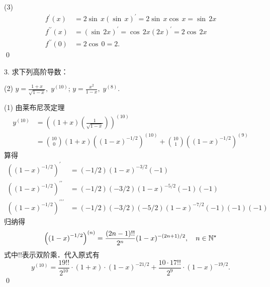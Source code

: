 (3) \solve
\begin{align}
    f^{\prime}(x) &= 2\sin \, x \left(\sin \, x\right)^\prime = 2 \sin \, x \cos \, x = \sin \, 2x \\
    f^{\prime\prime}(x) &= \left(\sin \, 2x\right)^\prime = \cos \, 2x \left(2x\right)^\prime = 2\cos \, 2x \\
    f^{\prime\prime}(0) &= 2 \cos \, 0 = 2.
\end{align}
\qed\bigskip

3. 求下列高阶导数：
\begin{tasks}(2)
    \task $y=\displaystyle\frac{1+x}{\sqrt{1-x}}, \; y^{(10)}$;
    \task $y=\displaystyle\frac{x^2}{1-x}, \; y^{(8)}$.
\end{tasks}
\bigskip

(1) \solve 由莱布尼茨定理
\begin{align}
    y^{(10)} &= \left(\left(1+x\right)\left(\frac{1}{\sqrt{1-x}}\right)\right)^{(10)} \\
    &= \binom{10}{0} \left(1+x\right)\left(\left(1-x\right)^{-1/2}\right)^{(10)} + \binom{10}{1}\left(\left(1-x\right)^{-1/2}\right)^{(9)}
\end{align}
算得
\begin{align}
    \left(\left(1-x\right)^{-1/2}\right)^\prime &=  (-1/2)\left(1-x\right)^{-3/2}(-1) \\
    \left(\left(1-x\right)^{-1/2}\right)^{\prime\prime} &=  (-1/2)(-3/2)\left(1-x\right)^{-5/2}(-1)(-1) \\
    \left(\left(1-x\right)^{-1/2}\right)^{\prime\prime\prime} &=  (-1/2)(-3/2)(-5/2)\left(1-x\right)^{-7/2}(-1)(-1)(-1) 
\end{align}
归纳得
\begin{align}
    \left(\left(1-x\right)^{-1/2}\right)^{(n)} = \frac{(2n-1)!!}{2^n}(1-x)^{-(2n+1)/2}, \quad n \in \mathbb{N}^\star
\end{align}
式中$!!$表示双阶乘．代入原式有
\begin{equation}
    y^{(10)} = \frac{19!!}{2^{10}}\cdot \left(1+x\right) \cdot (1-x)^{-21/2} + \frac{10 \cdot 17!!}{2^{9}} \cdot \left(1-x\right)^{-19/2}.
\end{equation}
\qed\bigskip

